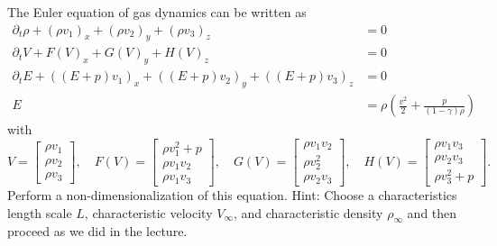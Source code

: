 \documentclass[12pt]{exam}
\newcommand{\del}{\partial}
\begin{document}
\begin{questions}
    
    \question The Euler equation of gas dynamics can be written as
    \begin{align*}
        \del_t \rho + (\rho v_1)_x + (\rho v_2)_y + (\rho v_3)_z &= 0 \\
        \del_t V + F(V)_x + G(V)_y + H(V)_z &= 0 \\
        \del_t E + ((E + p)v_1)_x + ((E + p)v_2)_y + ((E + p)v_3)_z &= 0 \\
        E &= \rho \left( \frac{v^2}{2} + \frac{p}{(1-\gamma) \rho} \right)
    \end{align*}
    with
    \begin{equation*}
        V = 
        \begin{bmatrix}
            \rho v_1 \\
            \rho v_2 \\
            \rho v_3
        \end{bmatrix}, \quad
        F(V) =
        \begin{bmatrix}
            \rho v_1^2 + p \\
            \rho v_1 v_2 \\
            \rho v_1 v_3
        \end{bmatrix}, \quad
        G(V) =
        \begin{bmatrix}
            \rho v_1 v_2 \\
            \rho v_2^2 \\
            \rho v_2 v_3
        \end{bmatrix}, \quad
        H(V) =
        \begin{bmatrix}
            \rho v_1 v_3 \\
            \rho v_2 v_3 \\
            \rho v_3^2 + p
        \end{bmatrix}.
    \end{equation*}
    Perform a non-dimensionalization of this equation. \newline
    Hint: Choose a characteristics length scale $L$, characteristic velocity $V_{\infty}$, and characteristic density $\rho_{\infty}$ and then proceed as we did in the lecture.
    

\end{questions}
\end{document}
